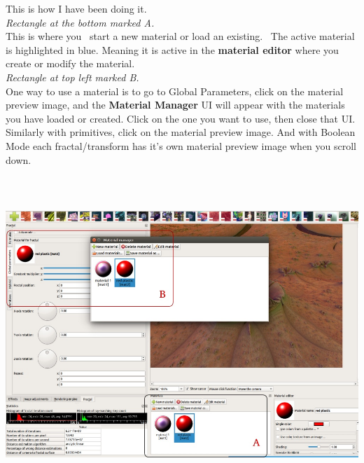 This is how I have been doing it.\\[2\baselineskip]\emph{Rectangle at the bottom
	marked A.}\\[2\baselineskip]This is where you~ start a new material or load an
existing.~ The active material is highlighted in blue. Meaning it is active in
the \textbf{material editor} where you create or modify the
material.\\[2\baselineskip]\emph{Rectangle at top left marked
	B.}\\[2\baselineskip]One way to use a material is to go to Global Parameters,
click on the material preview image, and the \textbf{Material Manager} UI will
appear with the materials you have loaded or created. Click on the one you want
to use, then close that UI.\\ Similarly with primitives, click on the material
preview image. And with Boolean Mode each fractal/transform has it's own
material preview image when you scroll down.

\includegraphics[width=6.69291in,height=4.68465in]{img/manual/media/image32.jpg}

